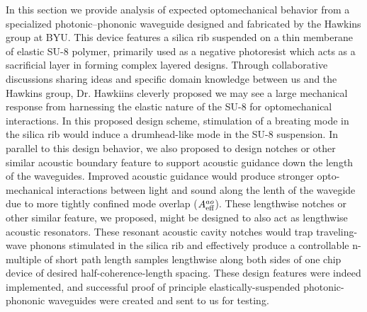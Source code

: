 In this section we provide analysis of expected optomechanical behavior from a specialized photonic--phononic waveguide designed and fabricated by the Hawkins group at \ac{BYU}. This device features a silica rib suspended on a thin memberane of elastic SU-8 polymer, primarily used as a negative photoresist which acts as a sacrificial layer in forming complex layered designs. Through collaborative discussions sharing ideas and specific domain knowledge between us and the Hawkins group, Dr. Hawkiins cleverly proposed we may see a large mechanical response from harnessing the elastic nature of the SU-8 for optomechanical interactions. In this proposed design scheme, stimulation of a breating mode in the silica rib would induce a drumhead-like mode in the SU-8 suspension. In parallel to this design behavior, we also proposed to design notches or other similar acoustic boundary feature to support acoustic guidance down the length of the waveguides. Improved acoustic guidance would produce stronger opto-mechanical interactions between light and sound along the lenth of the wavegide due to more tightly confined mode overlap (\(A_{\rm eff}^{ao}\)). These lengthwise notches or other similar feature, we proposed, might be designed to also act as lengthwise acoustic resonators. These resonant acoustic cavity notches would trap traveling-wave phonons stimulated in the silica rib and effectively produce a controllable n-multiple of short path length samples lengthwise along both sides of one chip device of desired half-coherence-length spacing. These design features were indeed implemented, and successful proof of principle elastically-suspended photonic-phononic waveguides were created and sent to us for testing.

